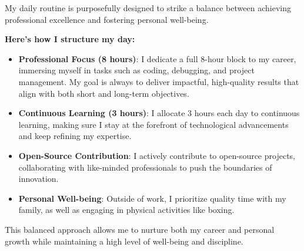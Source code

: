 

\divider

My daily routine is purposefully designed to strike a balance between achieving professional excellence and fostering personal well-being.

\textbf{\color{emphasis} Here's how I structure my day:}

\begin{itemize}

  \item \textbf{\color{emphasis}Professional Focus (8 hours)}: I dedicate a full 8-hour block to my career, immersing myself in tasks such as coding, debugging, and project management. My goal is always to deliver impactful, high-quality results that align with both short and long-term objectives.

  \item \textbf{\color{emphasis}Continuous Learning (3 hours)}: I allocate 3 hours each day to continuous learning, making sure I stay at the forefront of technological advancements and keep refining my expertise.

  \item \textbf{\color{emphasis}Open-Source Contribution}: I actively contribute to open-source projects, collaborating with like-minded professionals to push the boundaries of innovation.

  \item \textbf{\color{emphasis}Personal Well-being}: Outside of work, I prioritize quality time with my family, as well as engaging in physical activities like boxing.

\end{itemize}

This balanced approach allows me to nurture both my career and personal growth while maintaining a high level of well-being and discipline.